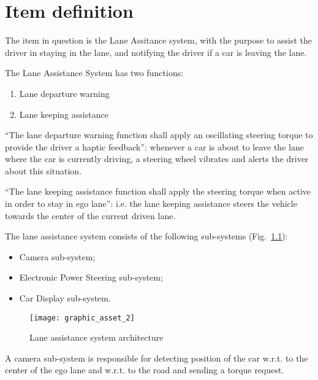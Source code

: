 \chapter{Item definition}
\label{ch:item_definition}

% 
% 
 
The item in question is the Lane Assitance system, with the purpose to assist
the driver in staying in the lane, and notifying the driver if a car is leaving
the lane.


The Lane Assistance System has two functions:

\begin{enumerate}
  \item Lane departure warning
  \item Lane keeping assistance
\end{enumerate}

``The lane departure warning function shall apply an oscillating steering torque
to provide the driver a haptic feedback'': whenever a car is about to leave 
the lane where the car is currently driving, a steering wheel vibrates and 
alerts the driver about this situation.


``The lane keeping assistance function shall apply the steering torque when
active in order to stay in ego lane'': i.e. the lane keeping assistance 
steers the vehicle towards the center of the current driven lane.


 
The lane assistance system consists of the following sub-systems
(Fig.~\ref{fig:architecture}):

\begin{itemize}
  \item Camera sub-system;
  \item Electronic Power Steering sub-system;
  \item Car Display sub-system.
\end{itemize}


\begin{figure}[htbp]
\texttt{[image: graphic\_asset\_2]}
\caption{Lane assistance system architecture}
\label{fig:architecture}
\end{figure}

A camera sub-system is responsible for detecting position of the car w.r.t. 
to the center of the ego lane and w.r.t. to the road and sending a torque
request.

